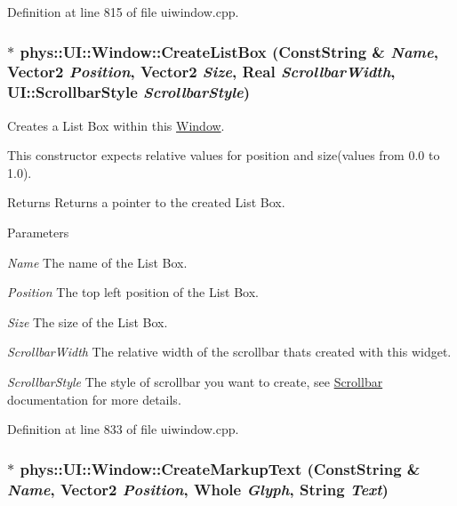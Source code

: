 Definition at line 815 of file uiwindow.cpp.

\hypertarget{classphys_1_1UI_1_1Window_a551f162bdb505f3fc497ff19d8ed9f01}{
\subsubsection[{CreateListBox}]{ $\ast$ phys::UI::Window::CreateListBox ({\bf ConstString} \& {\em Name}, \/  {\bf Vector2} {\em Position}, \/  {\bf Vector2} {\em Size}, \/  {\bf Real} {\em ScrollbarWidth}, \/  UI::ScrollbarStyle {\em ScrollbarStyle})}}
\label{d4/d86/classphys_1_1UI_1_1Window_a551f162bdb505f3fc497ff19d8ed9f01}


Creates a List Box within this \hyperlink{classphys_1_1UI_1_1Window}{Window}. 

This constructor expects relative values for position and size(values from 0.0 to 1.0). \begin{DoxyReturn}{Returns}
Returns a pointer to the created List Box. 
\end{DoxyReturn}

\begin{DoxyParams}{Parameters}
\item[{\em Name}]The name of the List Box. \item[{\em Position}]The top left position of the List Box. \item[{\em Size}]The size of the List Box. \item[{\em ScrollbarWidth}]The relative width of the scrollbar thats created with this widget. \item[{\em ScrollbarStyle}]The style of scrollbar you want to create, see \hyperlink{classphys_1_1UI_1_1Scrollbar}{Scrollbar} documentation for more details. \end{DoxyParams}


Definition at line 833 of file uiwindow.cpp.

\hypertarget{classphys_1_1UI_1_1Window_ad8750e7e7eed2ef68b2e5abb19075c62}{
\subsubsection[{CreateMarkupText}]{ $\ast$ phys::UI::Window::CreateMarkupText ({\bf ConstString} \& {\em Name}, \/  {\bf Vector2} {\em Position}, \/  {\bf Whole} {\em Glyph}, \/  {\bf String} {\em Text})}}
\label{d4/d86/classphys_1_1UI_1_1Window_ad8750e7e7eed2ef68b2e5abb19075c62}



